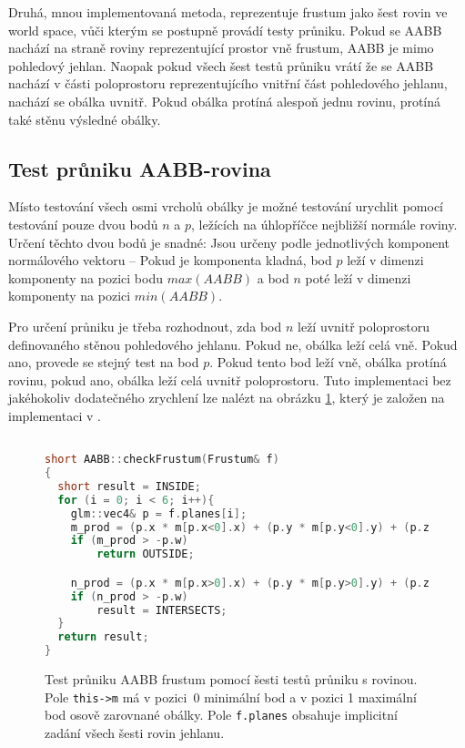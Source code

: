 \documentclass[report,11pt]{elsarticle}
\begin{document}
Druhá, mnou implementovaná metoda, reprezentuje frustum jako šest rovin ve world
space, vůči kterým se postupně provádí testy průniku. Pokud se AABB nachází
na straně roviny reprezentující prostor vně frustum, AABB je mimo pohledový
jehlan. Naopak pokud všech šest testů průniku vrátí že se AABB nachází v
části poloprostoru reprezentujícího vnitřní část pohledového jehlanu, nachází se
obálka uvnitř. Pokud obálka protíná alespoň jednu rovinu, protíná také stěnu
výsledné obálky.

\subsection{Test průniku AABB-rovina}

Místo testování všech osmi vrcholů obálky je možné testování urychlit pomocí
testování pouze dvou bodů $n$ a $p$, ležících na úhlopříčce nejbližší normále
roviny. Určení těchto dvou bodů je snadné: Jsou určeny podle jednotlivých
komponent normálového vektoru -- Pokud je komponenta kladná, bod $p$ leží
v dimenzi komponenty na pozici bodu $max(AABB)$ a bod $n$ poté leží v dimenzi
komponenty na pozici $min(AABB)$.

Pro určení průniku je třeba rozhodnout, zda bod $n$ leží uvnitř poloprostoru
definovaného stěnou pohledového jehlanu. Pokud ne, obálka leží celá vně. Pokud
ano, provede se stejný test na bod $p$. Pokud tento bod leží vně, obálka protíná
rovinu, pokud ano, obálka leží celá uvnitř poloprostoru. Tuto implementaci bez
jakéhokoliv dodatečného zrychlení lze nalézt na obrázku \ref{fig:AABBplane},
který je založen na implementaci v \cite{sykora2002efficient}.

\begin{figure}
    \centering
\begin{lstlisting}[language=C, basicstyle=\tiny]

short AABB::checkFrustum(Frustum& f)
{
  short result = INSIDE;
  for (i = 0; i < 6; i++){
    glm::vec4& p = f.planes[i];
    m_prod = (p.x * m[p.x<0].x) + (p.y * m[p.y<0].y) + (p.z * m[p.z<0].z);
    if (m_prod > -p.w)
	    return OUTSIDE;

    n_prod = (p.x * m[p.x>0].x) + (p.y * m[p.y>0].y) + (p.z * m[p.z>0].z);
    if (n_prod > -p.w)
	    result = INTERSECTS;
  }
  return result;
}
\end{lstlisting}
    \caption{Test průniku AABB frustum pomocí šesti testů průniku s rovinou.
    Pole \texttt{this->m} má v pozici~0 minimální bod a v pozici 1 maximální bod
    osově zarovnané obálky. Pole \texttt{f.planes} obsahuje implicitní zadání
    všech šesti rovin jehlanu.}
    \label{fig:AABBplane}
\end{figure}
\end{document}
